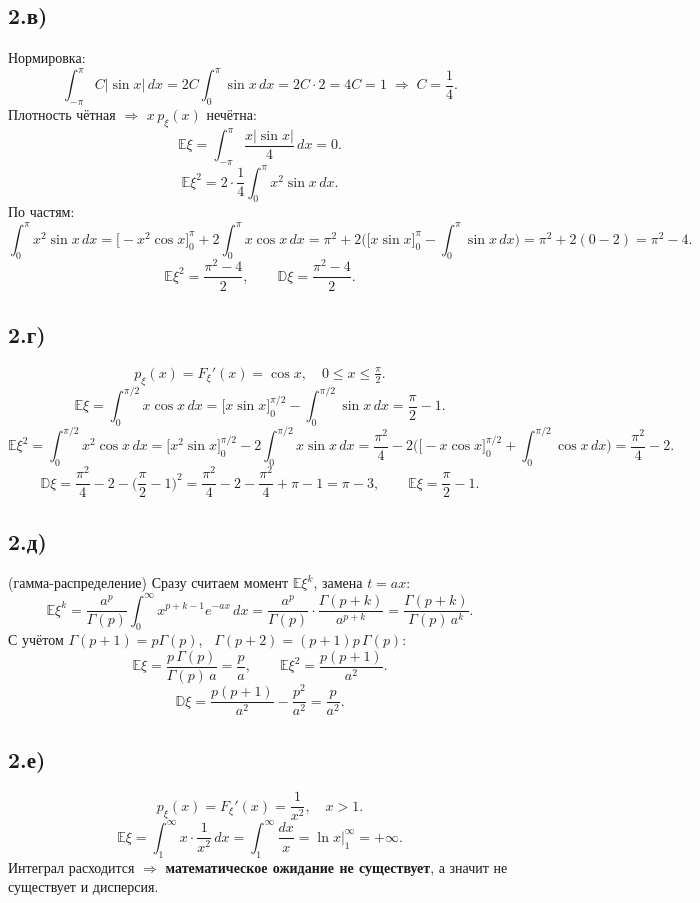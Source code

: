 \documentclass[11pt,a4paper]{article}
\newcommand{\E}{\mathbb{E}}
\newcommand{\D}{\mathbb{D}}
\begin{document}
\subsection*{2.в)}
Нормировка:
\[
  \int_{-\pi}^{\pi} C|\sin x|\,dx = 2C\int_0^\pi \sin x\,dx = 2C\cdot 2 = 4C = 1
  \;\Rightarrow\; C = \frac14 .
\]
Плотность чётная $\Rightarrow$ $x\,p_\xi(x)$ нечётна:
\[
  \E\xi = \int_{-\pi}^{\pi}\frac{x|\sin x|}{4}\,dx = \boxed{0}.
\]
\[
  \E\xi^2 = 2\cdot\frac14\int_0^\pi x^2\sin x\,dx .
\]
По частям:
\[
  \int_0^\pi x^2\sin x\,dx
  = \big[-x^2\cos x\big]_0^\pi + 2\int_0^\pi x\cos x\,dx
  = \pi^2 + 2\Big(\big[x\sin x\big]_0^\pi - \int_0^\pi \sin x\,dx\Big)
  = \pi^2 + 2(0-2) = \pi^2 - 4 .
\]
\[
  \E\xi^2 = \frac{\pi^2-4}{2}, \qquad \D\xi = \boxed{\frac{\pi^2-4}{2}}.
\]

\subsection*{2.г)}
\[
  p_\xi(x) = F_\xi'(x) = \cos x, \quad 0\le x\le \tfrac{\pi}{2} .
\]
\[
  \E\xi = \int_0^{\pi/2} x\cos x\,dx
        = \big[x\sin x\big]_0^{\pi/2} - \int_0^{\pi/2}\sin x\,dx
        = \frac{\pi}{2} - 1 .
\]
\[
  \E\xi^2 = \int_0^{\pi/2} x^2\cos x\,dx
          = \big[x^2\sin x\big]_0^{\pi/2} - 2\int_0^{\pi/2} x\sin x\,dx
          = \frac{\pi^2}{4} - 2\Big(\big[-x\cos x\big]_0^{\pi/2} + \int_0^{\pi/2}\cos x\,dx\Big)
          = \frac{\pi^2}{4} - 2 .
\]
\[
  \D\xi = \frac{\pi^2}{4} - 2 - \Big(\frac{\pi}{2}-1\Big)^2
        = \frac{\pi^2}{4} - 2 - \frac{\pi^2}{4} + \pi - 1 = \boxed{\pi - 3},
  \qquad \boxed{\E\xi = \frac{\pi}{2}-1}.
\]

\subsection*{2.д)} (гамма-распределение)
Сразу считаем момент $\E\xi^k$, замена $t = ax$:
\[
  \E\xi^k = \frac{a^p}{\Gamma(p)}\int_0^\infty x^{p+k-1}e^{-ax}\,dx
          = \frac{a^p}{\Gamma(p)}\cdot\frac{\Gamma(p+k)}{a^{p+k}}
          = \frac{\Gamma(p+k)}{\Gamma(p)\,a^k} .
\]
С учётом $\Gamma(p+1)=p\Gamma(p)$, \ $\Gamma(p+2)=(p+1)p\,\Gamma(p)$:
\[
  \E\xi = \frac{p\,\Gamma(p)}{\Gamma(p)\,a} = \boxed{\frac{p}{a}}, \qquad
  \E\xi^2 = \frac{p(p+1)}{a^2} .
\]
\[
  \D\xi = \frac{p(p+1)}{a^2} - \frac{p^2}{a^2} = \boxed{\frac{p}{a^2}}.
\]

\subsection*{2.е)}
\[
  p_\xi(x) = F_\xi'(x) = \frac{1}{x^2}, \quad x>1 .
\]
\[
  \E\xi = \int_1^\infty x\cdot\frac{1}{x^2}\,dx = \int_1^\infty\frac{dx}{x}
        = \ln x\Big|_1^\infty = +\infty .
\]
Интеграл расходится $\Rightarrow$ \textbf{математическое ожидание не существует},
а значит не существует и дисперсия.
\end{document}
